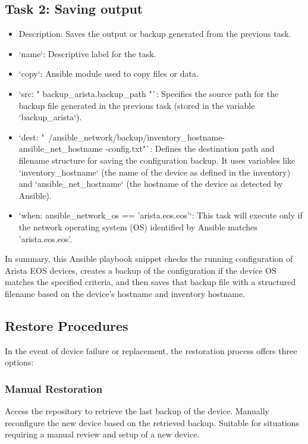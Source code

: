\subsection{Task 2: Saving output }
\begin{itemize}
    \item  Description: Saves the output or backup generated from the previous task.
    \item  `name`: Descriptive label for the task.
    \item  `copy`: Ansible module used to copy files or data.
    \item  `src: "{{ backup_arista.backup_path }}"`: Specifies the source path for the backup file generated in the previous task (stored in the variable `backup_arista`).
    \item  `dest: "~/ansible_network/backup/{{inventory_hostname}}-{{ ansible_net_hostname }}-config.txt"`: Defines the destination path and filename structure for saving the configuration backup. It uses variables like `inventory_hostname` (the name of the device as defined in the inventory) and `ansible_net_hostname` (the hostname of the device as detected by Ansible).
    \item  `when: ansible_network_os == 'arista.eos.eos'`: This task will execute only if the network operating system (OS) identified by Ansible matches 'arista.eos.eos'.
\end{itemize}

In summary, this Ansible playbook snippet checks the running configuration of Arista EOS devices, creates a backup of the configuration if the device OS matches the specified criteria, and then saves that backup file with a structured filename based on the device's hostname and inventory hostname.


\subsection{Restore Procedures}
In the event of device failure or replacement, the restoration process offers three options:

\subsubsection{Manual Restoration}
Access the repository to retrieve the last backup of the device.
Manually reconfigure the new device based on the retrieved backup.
Suitable for situations requiring a manual review and setup of a new device.

